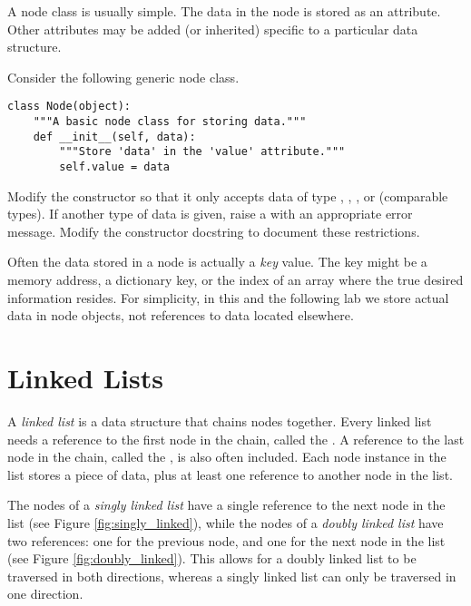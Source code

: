 A node class is usually simple.
The data in the node is stored as an attribute.
Other attributes may be added (or inherited) specific to a particular data structure.

\begin{problem} %
Consider the following generic node class.
\begin{lstlisting}
class Node(object):
    """A basic node class for storing data."""
    def __init__(self, data):
        """Store 'data' in the 'value' attribute."""
        self.value = data
\end{lstlisting}

Modify the constructor so that it only accepts data of type , , , or  (comparable types).
If another type of data is given, raise a  with an appropriate error message.
Modify the constructor docstring to document these restrictions.
\end{problem}

\begin{info}
Often the data stored in a node is actually a \emph{key} value.
The key might be a memory address, a dictionary key, or the index of an array where the true desired information resides.
For simplicity, in this and the following lab we store actual data in node objects, not references to data located elsewhere.
\end{info}

\section*{Linked Lists} %

A \emph{linked list} is a data structure that chains nodes together.
Every linked list needs a reference to the first node in the chain, called the .
A reference to the last node in the chain, called the , is also often included.
Each node instance in the list stores a piece of data, plus at least one reference to another node in the list.

The nodes of a \emph{singly linked list} have a single reference to the next node in the list (see Figure \ref{fig:singly_linked}), while the nodes of a \emph{doubly linked list} have two references: one for the previous node, and one for the next node in the list (see Figure \ref{fig:doubly_linked}).
This allows for a doubly linked list to be traversed in both directions, whereas a singly linked list can only be traversed in one direction.

